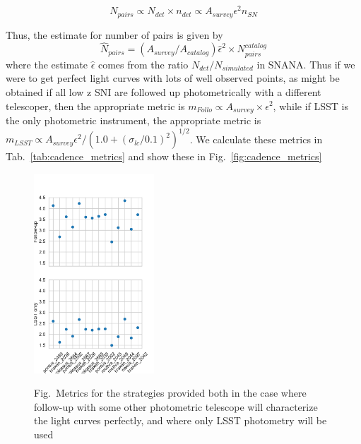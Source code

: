 \begin{equation}
    N_{pairs} \propto N_{det} \times {n_{det}} \propto A_{survey} \epsilon^2 {n_{SN}}
\end{equation}

Thus, the estimate for number of pairs is given by
\begin{equation}
    \hat{N}_{pairs} = \left( A_{survey} / A_{catalog} \right)\hat{\epsilon}^2 \times N_{pairs}^{catalog}
\end{equation}
where the estimate $\hat{\epsilon}$ comes from the ratio $N_{det}/ N_{simulated}$ in SNANA. Thus if we were to get perfect light curves with lots of well observed points, as might be obtained if all low z SNI are followed up photometrically with a different telescoper, then the appropriate metric is $m_{Follo} \propto A_{survey} \times \epsilon^2$, while if LSST is the only photometric instrument, the appropriate metric is
$m_{LSST} \propto A_{survey} \epsilon^2 /(1.0 + \left(\sigma_{lc}/0.1\right)^2)^{1/2}$. We calculate these metrics in Tab.~\ref{tab:cadence_metrics} and show these in Fig.~\ref{fig:cadence_metrics}

\begin{figure}
    \begin{center}
        {\includegraphics[width=0.4\textwidth]{figures/metrics}}
        \caption{Fig.~Metrics for the strategies provided both in the case where follow-up with some other photometric telescope will characterize the light curves perfectly, and where only LSST photometry will be used}
    \end{center}
    \label{fig:catalog_metrics}
\end{figure}

